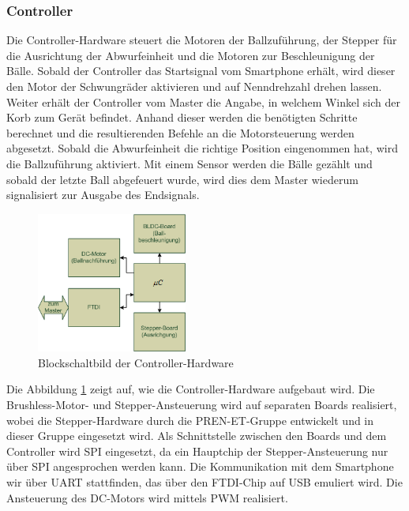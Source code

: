 \subsubsection{Controller}
\label{sec:Controller}
	Die Controller-Hardware steuert die Motoren der Ballzuführung, der Stepper für die Ausrichtung 
	der Abwurfeinheit und die Motoren zur Beschleunigung der Bälle. Sobald der Controller das Startsignal vom Smartphone erhält, 
	wird dieser den Motor der Schwungräder aktivieren und auf Nenndrehzahl drehen lassen. Weiter erhält der Controller vom Master die Angabe, 
	in welchem Winkel sich der Korb zum Gerät befindet. Anhand dieser werden die benötigten Schritte berechnet und die resultierenden Befehle 
	an die Motorsteuerung werden abgesetzt. Sobald die Abwurfeinheit die richtige Position eingenommen hat, wird die Ballzuführung aktiviert. 
	Mit einem Sensor werden die Bälle gezählt und sobald der letzte Ball abgefeuert wurde, wird dies dem Master wiederum signalisiert zur Ausgabe des Endsignals.\\
	\begin{figure}
		\centering
		\includegraphics[width=0.44\textwidth]{Enddokumentation/Loesungskonzept/Bilder/Blockschaltbild_Controller.png}
		\caption{Blockschaltbild der Controller-Hardware}
		\label{fig:Blockschaltbild_Controller}
	\end{figure}
	Die Abbildung \ref{fig:Blockschaltbild_Controller} zeigt auf, wie die Controller-Hardware aufgebaut wird. 
	Die Brushless-Motor- und Stepper-Ansteuerung wird auf separaten Boards realisiert, wobei die Stepper-Hardware durch die PREN-ET-Gruppe
	entwickelt und in dieser Gruppe eingesetzt wird. Als Schnittstelle zwischen den Boards und dem Controller wird SPI eingesetzt, 
	da ein Hauptchip der Stepper-Ansteuerung nur über SPI angesprochen werden kann. Die Kommunikation mit dem Smartphone wir über UART stattfinden, 
	das über den FTDI-Chip auf USB emuliert wird. Die Ansteuerung des DC-Motors wird mittels PWM realisiert.